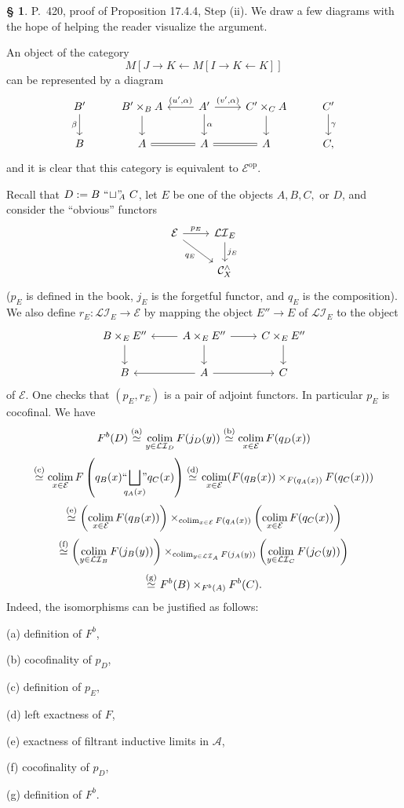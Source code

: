 \documentclass[12pt]{article}%
\theoremstyle{remark}
\theoremstyle{definition}
\newtheorem{s}[thm]{\S}%
\newcommand{\nn}{\noindent}
\newcommand{\cc}{\mathcal}
\newcommand{\A}{\mathcal A}
\newcommand{\C}{\mathcal C}
\DeclareMathOperator*{\col}{colim}
\DeclareMathOperator{\op}{op}
\begin{document}
\begin{s}
P.~420, proof of Proposition 17.4.4, Step (ii). We draw a few diagrams with the hope of helping the reader visualize the argument. 

An object of the category 
$$
M[J\to K\leftarrow M[I\to K\leftarrow K]]
$$ 
can be represented by a diagram 
$$
\begin{tikzcd}
B'\ar{d}[swap]{\beta}&B'\times_BA\ar{d}&A'\ar{l}[swap]{(u',\alpha)}\ar{r}{(v',\alpha)}\ar{d}{\alpha}&C'\times_CA\ar{d}&C'\ar{d}{\gamma}\\ 
B&A\ar[equal]{r}&A\ar[equal]{r}&A&C, 
\end{tikzcd}
$$ 
and it is clear that this category is equivalent to $\cc E^{\op}$. 

Recall that $D:=B\ ``\!\sqcup\!"\!\!_A\ C$, let $E$ be one of the objects $A,B,C,$ or $D$, and consider the ``obvious'' functors 
$$
\begin{tikzcd}
\cc E\ar{r}{p_E}\ar{rd}[swap]{q_E}&\cc{LI}_E\ar{d}{j_E}\\ 
{}&\C_X^\wedge
\end{tikzcd}
$$ 
($p_E$ is defined in the book, $j_E$ is the forgetful functor, and $q_E$ is the composition). We also define $r_E:\cc{LI}_E\to\cc E$ by mapping the object $E''\to E$ of $\cc{LI}_E$ to the object 
$$
\begin{tikzcd}
B\times_EE''\ar{d}&A\times_EE''\ar{l}\ar{r}\ar{d}&C\times_EE''\ar{d}\\ 
B&A\ar{r}\ar{l}&C
\end{tikzcd}
$$ 
of $\cc E$. One checks that $(p_E,r_E)$ is a pair of adjoint functors. In particular $p_E$ is cocofinal. We have
$$
F^b(D)
\overset{(\text a)}{\simeq}\col_{y\in\cc{LI}_D}F(j_D(y))
\overset{(\text b)}{\simeq}\col_{x\in\cc E}F(q_D(x))
$$
$$
\overset{(\text c)}{\simeq}\col_{x\in\cc E}F\left(q_B(x)``\!\!\!\bigsqcup_{q_A(x)}\!\!\!"q_C(x)\right)
\overset{(\text d)}{\simeq}\col_{x\in\cc E}(F(q_B(x))\times_{F(q_A(x))}F(q_C(x)))
$$
$$
\overset{(\text e)}{\simeq}\left(\col_{x\in\cc E}F(q_B(x))\right)\times_{\col_{x\in\cc E}F(q_A(x))}\left(\col_{x\in\cc E}F(q_C(x))\right)
$$ 
$$
\overset{(\text f)}{\simeq}\left(\col_{y\in\cc{LI}_B}F(j_B(y))\right)\times_{\col_{y\in\cc{LI}_A}F(j_A(y))}\left(\col_{y\in\cc{LI}_C}F(j_C(y))\right)
$$ 
$$
\overset{(\text g)}{\simeq}F^b(B)\times_{F^b(A)}F^b(C).
$$ 
Indeed, the isomorphisms can be justified as follows: 

\nn(a) definition of $F^b$, 

\nn(b) cocofinality of $p_D$,

\nn(c) definition of $p_E$, 

\nn(d) left exactness of $F$, 

\nn(e) exactness of filtrant inductive limits in $\A$, 

\nn(f) cocofinality of $p_D$, 

\nn(g) definition of $F^b$.
\end{s}
\end{document}
